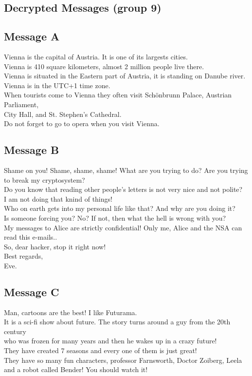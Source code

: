 \documentclass[a4paper,10pt]{article}
\begin{document}
\begin{appendices}

\section{Decrypted Messages (group 9)}

\subsection{Message A}
Vienna is the capital of Austria. It is one of its largests cities.\\
Vienna is 410 square kilometers, almost 2 million people live there.\\
Vienna is situated in the Eastern part of Austria, it is standing on Danube river.\\
Vienna is in the UTC+1 time zone.\\
When tourists come to Vienna they often visit  Schönbrunn Palace, Austrian Parliament,\\
City Hall, and St. Stephen's Cathedral.\\
Do not forget to go to opera when you visit Vienna.\\

\subsection{Message B}
Shame on you! Shame, shame, shame!
What are you trying to do? Are you trying to break my cryptosystem?\\
Do you know that reading other people's letters is not very nice and not polite?\\
I am not doing that knind of things!\\
Who on earth gets into my personal life like that? And why are you doing it?\\
Is someone forcing you? No? If not, then what the hell is wrong with you?\\
My messages to Alice are strictly confidential! Only me, Alice and the NSA can read this e-mails..\\
So, dear hacker, stop it right now!\\
Best regards,\\
Eve.\\

\subsection{Message C}
Man, cartoons are the best! I like Futurama.\\
It is a sci-fi show about future. The story turns around a guy from the 20th century\\
who was frozen for many years and then he wakes up in a crazy future!\\
They have created 7 seasons and every one of them is just great!\\
They have so many fun characters, professor Farnsworth, Doctor Zoiberg, Leela\\
and a robot called Bender! You should watch it!\\


\end{appendices}
\end{document}
